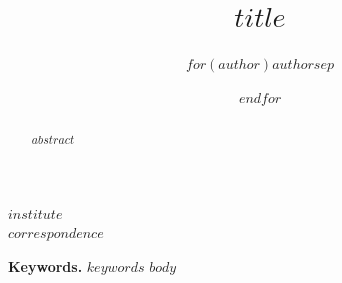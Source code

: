 \documentclass[11pt]{article}
\title{$title$}
\author{$for(author)$$author$$sep$ \and $endfor$}
\date{}
\begin{document}
\maketitle
\begin{center}\small $institute$\\$correspondence$\end{center}
\begin{abstract}
$abstract$
\end{abstract}
\noindent\textbf{Keywords.} $keywords$
$body$


\end{document}
